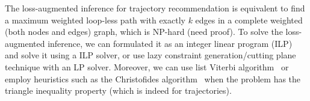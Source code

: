 \documentclass[9pt]{extarticle}
\newcommand{\eat}[1]{}
\begin{document}
The loss-augmented inference for trajectory recommendation is equivalent to 
find a maximum weighted loop-less path with exactly $k$ edges in a complete weighted (both nodes and edges) graph, which is NP-hard (need proof).
To solve the loss-augmented inference, we can formulated it as an integer linear program (ILP) and solve it using a ILP solver,
or use lazy constraint generation/cutting plane technique with an LP solver.
Moreover, we can use list Viterbi algorithm~\cite{nill1995list} or 
employ heuristics such as the Christofides algorithm~\cite{christofides1976} when the problem has the triangle inequality property 
(which is indeed for trajectories).


\eat{
\subsection{Other models}
\label{sec:other}
Label ranking model,
Plackett-Luce probabilistic ranking


\section{Evaluation metrics}
\label{sec:evaluation}
F1 score on points
F1 score on pairs
Kendall's tau, all POIs not appeared in trajectory are ranked last (and share the same rank).
}
\end{document}
